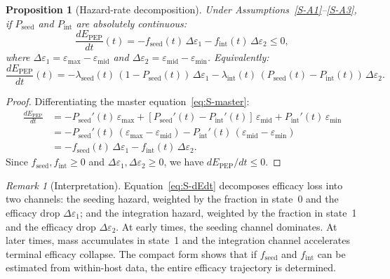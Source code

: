 \documentclass[12pt,a4paper]{article}
\theoremstyle{plain}
\newtheorem{proposition}{Proposition}
\theoremstyle{definition}
\theoremstyle{remark}
\newtheorem{remark}{Remark}
\newcommand{\Pint}{P_{\mathrm{int}}}
\newcommand{\Pseed}{P_{\mathrm{seed}}}
\newcommand{\Epep}{E_{\mathrm{PEP}}}
\begin{document}
\begin{proposition}[Hazard-rate decomposition]\label{prop:S-hazard}
Under Assumptions~\ref{S-A1}--\ref{S-A3}, if $\Pseed$ and $\Pint$ are absolutely continuous:
\begin{equation}\label{eq:S-dEdt}
    \frac{d\Epep}{dt}(t) = -f_{\mathrm{seed}}(t)\,\Delta\varepsilon_1 - f_{\mathrm{int}}(t)\,\Delta\varepsilon_2 \leq 0,
\end{equation}
where $\Delta\varepsilon_1 = \varepsilon_{\max} - \varepsilon_{\mathrm{mid}}$ and $\Delta\varepsilon_2 = \varepsilon_{\mathrm{mid}} - \varepsilon_{\min}$. Equivalently:
\begin{equation}\label{eq:S-dEdt-hazard}
    \frac{d\Epep}{dt}(t) = -\lambda_{\mathrm{seed}}(t)\,(1 - \Pseed(t))\,\Delta\varepsilon_1 - \lambda_{\mathrm{int}}(t)\,(\Pseed(t) - \Pint(t))\,\Delta\varepsilon_2.
\end{equation}
\end{proposition}

\begin{proof}
Differentiating the master equation~\eqref{eq:S-master}:
\begin{align*}
    \frac{d\Epep}{dt} &= -\Pseed'(t)\,\varepsilon_{\max} + [\Pseed'(t) - \Pint'(t)]\,\varepsilon_{\mathrm{mid}} + \Pint'(t)\,\varepsilon_{\min} \\
    &= -\Pseed'(t)\,(\varepsilon_{\max} - \varepsilon_{\mathrm{mid}}) - \Pint'(t)\,(\varepsilon_{\mathrm{mid}} - \varepsilon_{\min}) \\
    &= -f_{\mathrm{seed}}(t)\,\Delta\varepsilon_1 - f_{\mathrm{int}}(t)\,\Delta\varepsilon_2.
\end{align*}
Since $f_{\mathrm{seed}}, f_{\mathrm{int}} \geq 0$ and $\Delta\varepsilon_1, \Delta\varepsilon_2 \geq 0$, we have $d\Epep/dt \leq 0$.
\end{proof}

\begin{remark}[Interpretation]\label{rem:S-interp}
Equation~\eqref{eq:S-dEdt} decomposes efficacy loss into two channels: the seeding hazard, weighted by the fraction in state~0 and the efficacy drop $\Delta\varepsilon_1$; and the integration hazard, weighted by the fraction in state~1 and the efficacy drop $\Delta\varepsilon_2$. At early times, the seeding channel dominates. At later times, mass accumulates in state~1 and the integration channel accelerates terminal efficacy collapse. The compact form shows that if $f_{\mathrm{seed}}$ and $f_{\mathrm{int}}$ can be estimated from within-host data, the entire efficacy trajectory is determined.
\end{remark}
\end{document}
